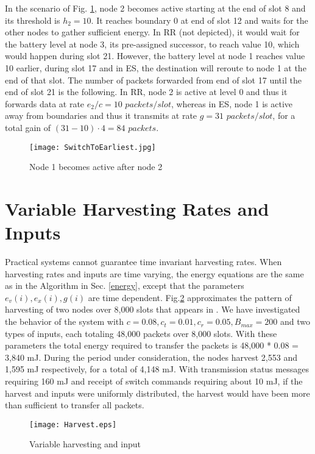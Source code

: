 \documentclass[12 pt]{article}
\newcommand{\debug}[1]{\mbox{\tt #1}}
\renewcommand{\debug}[1]{}              \newcommand{\cmd}[1]{}
\newcommand{\2}{\>\>}
\newcommand{\3}{\>\>\>}
\newcommand{\4}{\>\>\>\>}
\newcommand{\5}{\>\>\>\>\>}
\newcommand{\6}{\>\>\>\>\>\>}
\newcommand{\7}{\6\>}
\newcommand{\8}{\6\2}
\newcommand{\sname}{}
\newcommand{\dcite}[1]{\cite{#1}\debug{[#1]}\cmd{dcite}}
\newcommand{\dref}[1]{\ref{#1}\debug{[#1]}\cmd{dref}}
\newcommand{\dlabelx}[1]{\debug{\fbox{\tiny #1}}\label{#1}}
\newcommand{\msec}[2]{\renewcommand{\sname}{}\section[#1
	\debug{\fbox {#2}}]{#1 \cmd{msec} \dlabelx{#2}}\markboth{\today}{Sec. \thesection}}
\begin{document}
In the scenario of Fig. \dref{fig-case6}, node 2 becomes active starting at the end of slot 8 and its threshold is $h_2 = 10$. It reaches boundary 0 at end of slot 12 and waits for the other nodes to gather sufficient energy.  In RR (not depicted), it would wait for the battery level at node 3, its pre-assigned successor, to reach value 10, which would happen during slot 21.   However, the battery level at node 1 reaches value 10 earlier, during slot 17 and in ES, the destination will reroute to node 1 at the end of that slot.  The number of packets forwarded from end of slot 17 until the end of slot 21 is the following. In RR, node 2 is active at level 0 and thus it forwards data at rate $e_2/c = 10 \,\, packets/slot$, whereas in ES, node 1 is active away from boundaries and thus it transmits at rate $g = 31 \,\, packets/slot$, for a total gain of $(31-10) \cdot 4 = 84 \,\, packets$.

\begin{figure}[hbtp]
\begin{center}
\texttt{[image: SwitchToEarliest.jpg]}
\caption{Node 1 becomes active after node 2\debug{\fbox{fig-case6}}\label{fig-case6}}
\end{center}
\end{figure}


\msec{Variable Harvesting Rates and Inputs}{variableV}

Practical systems cannot guarantee time invariant harvesting rates.  When harvesting rates and inputs are time varying, the energy equations are the same as in the Algorithm in Sec. \dref{energy}, except that the parameters $e_v(i),e_x(i),g(i)$ are time dependent.
Fig.\dref{fig-Harvest} approximates the pattern of harvesting of two nodes over 8,000 slots that appears in \dcite{GMSplus}.  We have investigated the behavior of the system with $c = 0.08, c_t = 0.01, c_r = 0.05, B_{max} = 200$ and two types of inputs, each totaling 48,000 packets over 8,000 slots.  With these parameters the total energy required to transfer the packets is 48,000 * 0.08 = 3,840 mJ.  During the period under consideration, the nodes harvest 2,553 and 1,595 mJ respectively, for a total of 4,148 mJ.  With transmission status messages requiring 160 mJ and receipt of switch commands requiring about 10 mJ, if the harvest and inputs were uniformly distributed, the harvest would have been more than sufficient to transfer all packets.

\begin{figure}[hbtp]
\begin{center}
\texttt{[image: Harvest.eps]}
\caption{Variable harvesting and input\debug{\fbox{fig-Harvest}}\label{fig-Harvest}}
\end{center}
\end{figure}
\end{document}

